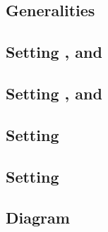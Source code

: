 \subsection{Generalities}                                                                                    \label{bls: generalities for malformed and wellformed}      
\subsection{Setting \malformedDataInternalBit, \malformedDataInternalAcc{} and \malformedDataInternalTot}    \label{bls: malformed internal bit acc justification}       
\subsection{Setting \malformedDataExternalBit, \malformedDataExternalAcc{} and \malformedDataExternalTot}    \label{bls: malformed external bit acc justification}       
\subsection{Setting \nontrivialPairOfPointsBit{}}                                                            \label{bls: setting nontrivial pair of points bit}          
\subsection{Setting \nontrivialPairOfPointsAcc{}}                                                            \label{bls: setting nontrivial pair of points acc}          
\subsection{Diagram}                                                                                         \label{bls: setting diagrams}                               
